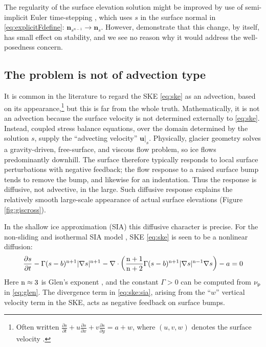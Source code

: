 \documentclass[hidelinks,onefignum,onetabnum,final]{siamart220329}  %
\newcommand{\grad}{\nabla}
\newcommand{\Div}{\nabla\cdot}
\newcommand{\bn}{\mathbf{n}}
\newcommand{\bu}{\mathbf{u}}
\newcommand{\nn}{{\text{\textnormal{n}}}}
\newcommand{\pp}{{\text{\textnormal{p}}}}
\begin{document}
The regularity of the surface elevation solution might be improved by use of semi-implicit Euler time-stepping  \cite{LofgrenAhlkronaHelanow2022}, which uses $s$ in the surface normal in \eqref{eq:explicitFdefine}: $\bn_{s^{n-1}} \to \bn_s$.  However, \cite{LofgrenAhlkronaHelanow2022} demonstrate that this change, by itself, has small effect on stability, and we see no reason why it would address the well-posedness concern.

\subsection{The problem is not of advection type} \label{subsec:notadv}  It is common in the literature to regard the SKE \eqref{eq:ske} as an advection, based on its appearance,\footnote{Often written $\frac{\partial s}{\partial t} + u \frac{\partial s}{\partial x} + v \frac{\partial s}{\partial y} = a + w$, where $(u,v,w)$ denotes the surface velocity \cite{GreveBlatter2009,SchoofHewitt2013}.} but this is far from the whole truth.  Mathematically, it is not an advection because the surface velocity is not determined externally to \eqref{eq:ske}.  Instead, coupled stress balance equations, over the domain determined by the solution $s$, supply the ``advecting velocity'' $\bu|_s$.  Physically, glacier geometry solves a gravity-driven, free-surface, and viscous flow problem, so ice flows predominantly downhill.  The surface therefore typically responds to local surface perturbations with negative feedback; the flow response to a raised surface bump tends to remove the bump, and likewise for an indentation.  Thus the response is diffusive, not advective, in the large.  Such diffusive response explains the relatively smooth large-scale appearance of actual surface elevations (Figure \ref{fig:giscross}).

In the shallow ice approximation (SIA) this diffusive character is precise.  For the non-sliding and isothermal SIA model \cite{GreveBlatter2009,JouvetBueler2012}, SKE \eqref{eq:ske} is seen to be a nonlinear diffusion:
\begin{equation}
\frac{\partial s}{\partial t} - \Gamma (s-b)^{\nn+1} |\grad s|^{\nn+1} - \Div \left(\frac{\nn+1}{\nn+2} \Gamma (s-b)^{\nn+1} |\grad s|^{\nn-1} \grad s\right) - a = 0  \label{eq:ske:sia}
\end{equation}
Here $\nn\approx 3$ is Glen's exponent \cite{GreveBlatter2009}, and the constant $\Gamma>0$ can be computed from $\nu_\pp$ in \eqref{eq:glen}.  The divergence term in \eqref{eq:ske:sia}, arising from the ``$w$'' vertical velocity term in the SKE, acts as negative feedback on surface bumps.
\end{document}
